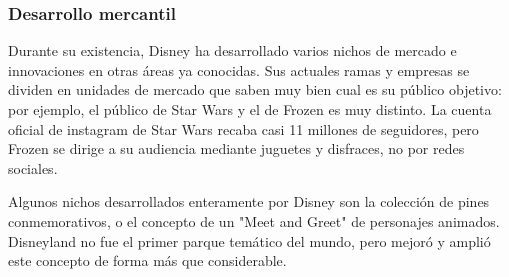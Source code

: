 \subsubsection{Desarrollo mercantil}
Durante su existencia, Disney ha desarrollado varios nichos de mercado e innovaciones en otras áreas ya conocidas. Sus actuales ramas y empresas se dividen en unidades de mercado que saben muy bien cual es su público objetivo: por ejemplo, el público de Star Wars y el de Frozen es muy distinto. La cuenta oficial de instagram de Star Wars recaba casi 11 millones de seguidores, pero Frozen se dirige a su audiencia mediante juguetes y disfraces, no por redes sociales.
 
Algunos nichos desarrollados enteramente por Disney son la colección de pines conmemorativos, o el concepto de un "Meet and Greet" de personajes animados. Disneyland no fue el primer parque temático del mundo, pero mejoró y amplió este concepto de forma más que considerable.


 
 